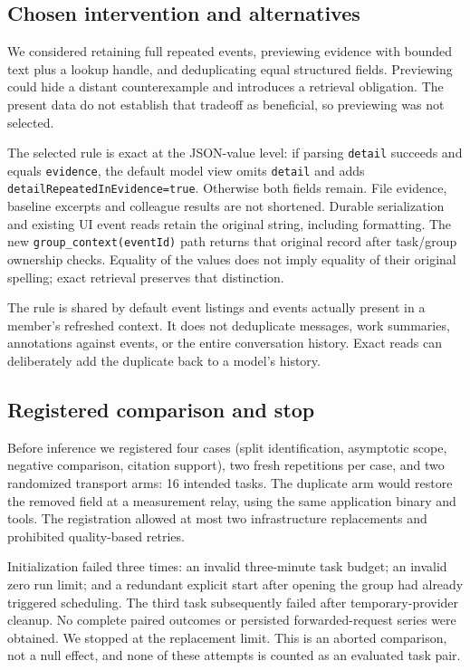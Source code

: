 \documentclass[11pt,a4paper]{article}
\begin{document}
\subsection{Chosen intervention and alternatives}
We considered retaining full repeated events, previewing evidence with bounded text plus a lookup handle, and deduplicating equal structured fields. Previewing could hide a distant counterexample and introduces a retrieval obligation. The present data do not establish that tradeoff as beneficial, so previewing was not selected.

The selected rule is exact at the JSON-value level: if parsing \texttt{detail} succeeds and equals \texttt{evidence}, the default model view omits \texttt{detail} and adds \texttt{detailRepeatedInEvidence=true}. Otherwise both fields remain. File evidence, baseline excerpts and colleague results are not shortened. Durable serialization and existing UI event reads retain the original string, including formatting. The new \texttt{group\_context(eventId)} path returns that original record after task/group ownership checks. Equality of the values does not imply equality of their original spelling; exact retrieval preserves that distinction.

The rule is shared by default event listings and events actually present in a member's refreshed context. It does not deduplicate messages, work summaries, annotations against events, or the entire conversation history. Exact reads can deliberately add the duplicate back to a model's history.

\subsection{Registered comparison and stop}
Before inference we registered four cases (split identification, asymptotic scope, negative comparison, citation support), two fresh repetitions per case, and two randomized transport arms: 16 intended tasks. The duplicate arm would restore the removed field at a measurement relay, using the same application binary and tools. The registration allowed at most two infrastructure replacements and prohibited quality-based retries.

Initialization failed three times: an invalid three-minute task budget; an invalid zero run limit; and a redundant explicit start after opening the group had already triggered scheduling. The third task subsequently failed after temporary-provider cleanup. No complete paired outcomes or persisted forwarded-request series were obtained. We stopped at the replacement limit. This is an aborted comparison, not a null effect, and none of these attempts is counted as an evaluated task pair.
\end{document}
